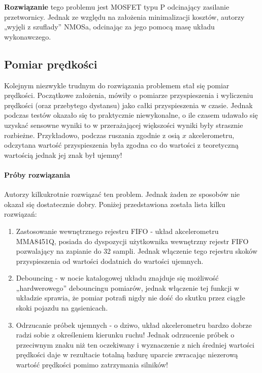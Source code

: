         \textbf{Rozwiązanie} tego problemu jest MOSFET typu P odcinający zasilanie przetwornicy.
        Jednak ze względu na założenia minimalizacji kosztów, autorzy „wyjęli z szuflady” NMOSa, odcinając za jego pomocą masę układu wykonawczego.


    \subsection{Pomiar prędkości}
        \tab Kolejnym niezwykle trudnym do rozwiązania problemem stał się pomiar prędkości.
        Początkowe założenia, mówiły o pomiarze przyspieszenia i wyliczeniu prędkości (oraz przebytego dystansu) jako całki przyspieszenia w czasie.
        Jednak podczas testów okazało się to praktycznie niewykonalne, o ile czasem udawało się uzyskać sensowne wyniki to w przerażającej większości wyniki były strasznie rozbieżne.
        Przykładowo, podczas ruszania zgodnie z osią $x$ akcelerometru, odczytana wartość przyspieszenia była zgodna co do wartości z teoretyczną wartością jednak jej znak był ujemny!

        \paragraph{Próby rozwiązania\\}
        Autorzy kilkukrotnie rozwiązać ten problem. 
        Jednak żaden ze sposobów nie okazał się dostatecznie dobry.
        Poniżej przedstawiona została lista kilku rozwiązań:
        \begin{enumerate}
            \item Zastosowanie wewnętrznego rejestru FIFO - układ akcelerometru MMA8451Q, posiada do dyspozycji użytkownika wewnętrzny rejestr FIFO pozwalający na zapianie do 32 sampli.
            Jednak włączenie tego rejestru skoków przyspieszenia od wartości dodatnich do wartości ujemnych.
            \item Debouncing - w nocie katalogowej układu znajduje się możliwość „hardwerowego” debouncingu pomiarów, jednak włączenie tej funkcji w układzie sprawia, że pomiar potrafi nigdy nie dość do skutku przez ciągłe skoki pojazdu na gąsienicach.
            \item Odrzucanie próbek ujemnych - o dziwo, układ akcelerometru bardzo dobrze radzi sobie z określeniem kierunku ruchu! Jednak odrzucenie próbek o przeciwnym znaku niż ten oczekiwany i wyznaczenie z nich średniej wartości prędkości daje w rezultacie totalną bzdurę uparcie zwracając niezerową wartość prędkości pomimo zatrzymania silników!
        \end{enumerate}

